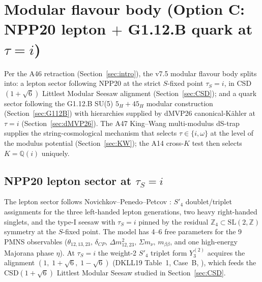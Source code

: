 \documentclass[a4paper,11pt]{article}
\newcommand{\Spf}{S'_4}
\newcommand{\Qi}{\mathbb{Q}(i)}
\theoremstyle{definition}
\theoremstyle{remark}
\begin{document}
\begin{table}[ht]
\caption{ECI v7.5 axiom set, post-A79 H1 partition (S5 graft 2026-05-06).
H1 is now partitioned: 4 sub-classes \textsc{Established}
($H_{1,\mathrm{a}}$--$H_{1,\mathrm{d}}$; ECI exploits $H_{1,\mathrm{a}}$
and $H_{1,\mathrm{d}}$); 4 sub-classes \textsc{Conjectural} but outside
the ECI Cassini-clean regime ($\xi=1/6$, flat FRW, no Bianchi, no massive
coupling) and NOT weakening the hard core.
CLPW23 = arXiv:2206.10780; KFLS24 = arXiv:2406.01669 (A79 live-verified
2026-05-05).  Estab.\ = Established; W-Conf.\ = Working-Confirmed;
Conj.\ = Conjectural; Post.\ = Postulate.
\emph{[S5 coord.\ note: if S1 edits the H7' row above, parent must
merge manually.]}}
\label{tab:axioms-lakatos}
\end{table}

\section{Modular flavour body (Option C: NPP20 lepton $+$
         G1.12.B quark at $\tau=i$)}
\label{sec:flavour}

Per the A46 retraction (Section~\ref{sec:intro}), the v7.5 modular
flavour body splits into: a lepton sector following NPP20
\cite{NPP20} at the strict $S$-fixed point $\tau_S=i$, in
CSD$(1+\sqrt 6)$ Littlest Modular Seesaw alignment
(Section~\ref{sec:CSD}); and a quark sector following the
G1.12.B SU(5) $5_H+45_H$ modular construction
(Section~\ref{sec:G112B}) with hierarchies supplied by dMVP26
canonical-K\"ahler at $\tau=i$ (Section~\ref{sec:dMVP26}).  The
A47 King--Wang multi-modulus dS-trap supplies the
string-cosmological mechanism that selects $\tau\in\{i,\omega\}$
at the level of the modulus potential
(Section~\ref{sec:KW}); the A14 cross-$K$ test then selects
$K=\Qi$ uniquely.

\subsection{NPP20 lepton sector at $\tau_S=i$}
\label{sec:NPP20}

The lepton sector follows Novichkov--Penedo--Petcov
\cite{NPP20}: $\Spf$ doublet/triplet assignments for the three
left-handed lepton generations, two heavy right-handed singlets,
and the type-I seesaw with $\tau_S=i$ pinned by the residual
$\mathbb{Z}_4\subset\mathrm{SL}(2,\mathbb{Z})$ symmetry at the
$S$-fixed point.  The model has 4--6 free parameters for the 9
PMNS observables ($\theta_{12,13,23},\,\delta_{CP},\,
\Delta m_{12,23}^{2},\,\Sigma m_\nu,\,m_{\beta\beta}$, and one
high-energy Majorana phase $\eta$).  At $\tau_S=i$ the weight-2
$\Spf$ triplet form $Y_3^{(2)}$ acquires the alignment
$(1,\;1+\sqrt{6},\;1-\sqrt{6})$ (DKLL19 Table~1, Case~B,
\cite{DKLL19}), which feeds the CSD$(1+\sqrt 6)$ Littlest Modular
Seesaw studied in Section~\ref{sec:CSD}.
\end{document}
